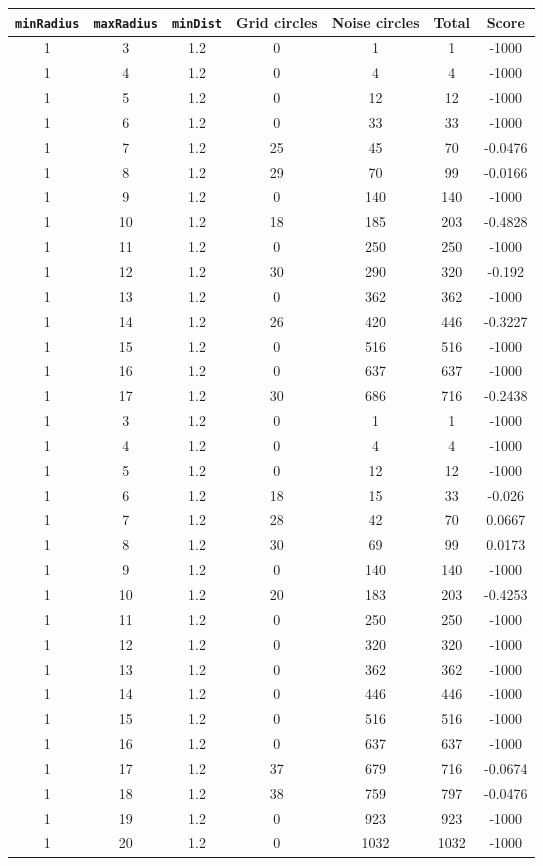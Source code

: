 \documentclass[letterpaper, 12pt]{article}
\begin{document}
\begin{longtable}{|c|c|c|c|c|c|c|}
\hline
\textbf{\texttt{minRadius}} & \textbf{\texttt{maxRadius}} & \textbf{\texttt{minDist}} & \textbf{Grid circles} & \textbf{Noise circles} & \textbf{Total} & \textbf{Score} \\
\hline
1 & 3 & 1.2 & 0 & 1 & 1 & -1000 \\
\hline
1 & 4 & 1.2 & 0 & 4 & 4 & -1000 \\
\hline
1 & 5 & 1.2 & 0 & 12 & 12 & -1000 \\
\hline
1 & 6 & 1.2 & 0 & 33 & 33 & -1000 \\
\hline
1 & 7 & 1.2 & 25 & 45 & 70 & -0.0476 \\
\hline
1 & 8 & 1.2 & 29 & 70 & 99 & -0.0166 \\
\hline
1 & 9 & 1.2 & 0 & 140 & 140 & -1000 \\
\hline
1 & 10 & 1.2 & 18 & 185 & 203 & -0.4828 \\
\hline
1 & 11 & 1.2 & 0 & 250 & 250 & -1000 \\
\hline
1 & 12 & 1.2 & 30 & 290 & 320 & -0.192 \\
\hline
1 & 13 & 1.2 & 0 & 362 & 362 & -1000 \\
\hline
1 & 14 & 1.2 & 26 & 420 & 446 & -0.3227 \\
\hline
1 & 15 & 1.2 & 0 & 516 & 516 & -1000 \\
\hline
1 & 16 & 1.2 & 0 & 637 & 637 & -1000 \\
\hline
1 & 17 & 1.2 & 30 & 686 & 716 & -0.2438 \\
\hline
1 & 3 & 1.2 & 0 & 1 & 1 & -1000 \\
\hline
1 & 4 & 1.2 & 0 & 4 & 4 & -1000 \\
\hline
1 & 5 & 1.2 & 0 & 12 & 12 & -1000 \\
\hline
1 & 6 & 1.2 & 18 & 15 & 33 & -0.026 \\
\hline
1 & 7 & 1.2 & 28 & 42 & 70 & 0.0667 \\
\hline
1 & 8 & 1.2 & 30 & 69 & 99 & 0.0173 \\
\hline
1 & 9 & 1.2 & 0 & 140 & 140 & -1000 \\
\hline
1 & 10 & 1.2 & 20 & 183 & 203 & -0.4253 \\
\hline
1 & 11 & 1.2 & 0 & 250 & 250 & -1000 \\
\hline
1 & 12 & 1.2 & 0 & 320 & 320 & -1000 \\
\hline
1 & 13 & 1.2 & 0 & 362 & 362 & -1000 \\
\hline
1 & 14 & 1.2 & 0 & 446 & 446 & -1000 \\
\hline
1 & 15 & 1.2 & 0 & 516 & 516 & -1000 \\
\hline
1 & 16 & 1.2 & 0 & 637 & 637 & -1000 \\
\hline
1 & 17 & 1.2 & 37 & 679 & 716 & -0.0674 \\
\hline
1 & 18 & 1.2 & 38 & 759 & 797 & -0.0476 \\
\hline
1 & 19 & 1.2 & 0 & 923 & 923 & -1000 \\
\hline
1 & 20 & 1.2 & 0 & 1032 & 1032 & -1000 \\
\hline
\end{longtable}
\end{document}
